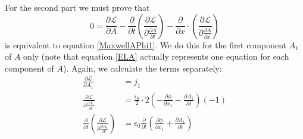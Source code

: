 \documentclass[prb,preprint]{revtex4-1}
\begin{document}
For the second part we must prove that
\begin{equation} \label{ELA}
0 = \frac{\partial \mathcal{L}}{\partial A}
-\frac{\partial}{\partial t} \left( \frac{\partial \mathcal{L}}{\partial \frac{\partial A}{\partial t}} \right) 
-\frac{\partial}{\partial x} \cdot \left( \frac{\partial \mathcal{L}}{\partial \frac{\partial A}{\partial x}} \right)
\end{equation}
is equivalent to equation \eqref{MaxwellAPhi1}.
We do this for the first component $A_1$ of $A$ only (note that equation \eqref{ELA} actually represents one equation for each component of $A$).
Again, we calculate the terms separately:
\begin{align}
\frac{\partial \mathcal{L}}{\partial A_1} &= j_1 \\
\frac{\partial \mathcal{L}}{\partial \frac{\partial A_1}{\partial t} }
&= \frac{\epsilon_0}{2} \cdot 2 \left(-\frac{\partial \phi}{\partial x_1} - \frac{\partial A_1}{\partial t}\right) (-1) \\
\frac{\partial}{\partial t} \left(\frac{\partial \mathcal{L}}{\partial \frac{\partial A_1}{\partial t} } \right)
&= \epsilon_0 \frac{\partial}{\partial t} \left(\frac{\partial \phi}{\partial x_1} + \frac{\partial A_1}{\partial t}\right)
\end{align}
\end{document}
